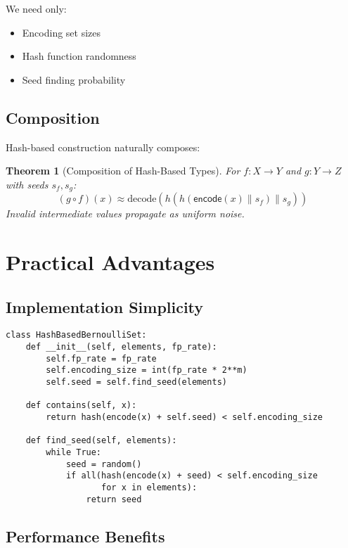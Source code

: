\documentclass[11pt,final,hidelinks]{article}
\newtheorem{theorem}{Theorem}[section]
\newcommand{\Encode}[1]{\mathsf{encode}(#1)}
\newcommand{\Hash}[1]{h(#1)}
\begin{document}
We need only:
\begin{itemize}
    \item Encoding set sizes
    \item Hash function randomness
    \item Seed finding probability
\end{itemize}

\subsection{Composition}

Hash-based construction naturally composes:

\begin{theorem}[Composition of Hash-Based Types]
For $f: X \to Y$ and $g: Y \to Z$ with seeds $s_f, s_g$:
\begin{equation}
(g \circ f)(x) \approx \text{decode}(\Hash{\Hash{\Encode{x} \| s_f} \| s_g})
\end{equation}
Invalid intermediate values propagate as uniform noise.
\end{theorem}

\section{Practical Advantages}

\subsection{Implementation Simplicity}

\begin{verbatim}
class HashBasedBernoulliSet:
    def __init__(self, elements, fp_rate):
        self.fp_rate = fp_rate
        self.encoding_size = int(fp_rate * 2**m)
        self.seed = self.find_seed(elements)
    
    def contains(self, x):
        return hash(encode(x) + self.seed) < self.encoding_size
    
    def find_seed(self, elements):
        while True:
            seed = random()
            if all(hash(encode(x) + seed) < self.encoding_size 
                   for x in elements):
                return seed
\end{verbatim}

\subsection{Performance Benefits}
\end{document}
